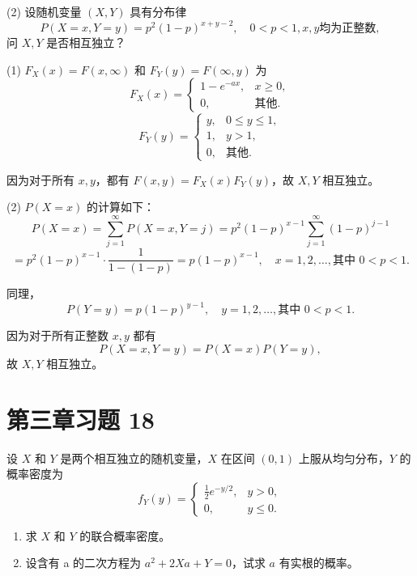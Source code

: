 \documentclass[twoside]{article}
\begin{document}
(2) 设随机变量 \( (X, Y) \) 具有分布律
\[
P(X = x, Y = y) = p^2 (1 - p)^{x + y - 2}, \quad 0 < p < 1, x, y \text{均为正整数},
\]
问 \( X, Y \) 是否相互独立？


\begin{ans}{17}{17}
    (1) \( F_X(x) = F(x, \infty) \) 和 \( F_Y(y) = F(\infty, y) \) 为
    \[
    F_X(x) = 
    \begin{cases}
    1 - e^{-ax}, & x \geq 0, \\
    0, & \text{其他}.
    \end{cases}
    \]
    \[
    F_Y(y) = 
    \begin{cases}
    y, & 0 \leq y \leq 1, \\
    1, & y > 1, \\
    0, & \text{其他}.
    \end{cases}
    \]
    
    因为对于所有 \( x, y \)，都有 \( F(x, y) = F_X(x) F_Y(y) \)，故 \( X, Y \) 相互独立。
    
    (2) \( P(X = x) \) 的计算如下：
    \[
    P(X = x) = \sum_{j=1}^{\infty} P(X = x, Y = j) = p^2 (1 - p)^{x - 1} \sum_{j=1}^{\infty} (1 - p)^{j - 1}
    \]
    \[
    = p^2 (1 - p)^{x - 1} \cdot \frac{1}{1 - (1 - p)} = p(1 - p)^{x - 1}, \quad x = 1, 2, \dots, \text{其中 } 0 < p < 1.
    \]
    
    同理，
    \[
    P(Y = y) = p(1 - p)^{y - 1}, \quad y = 1, 2, \dots, \text{其中 } 0 < p < 1.
    \]
    
    因为对于所有正整数 \( x, y \) 都有
    \[
    P(X = x, Y = y) = P(X = x) P(Y = y),
    \]
    故 \( X, Y \) 相互独立。

\end{ans}

\section{第三章习题 18}

设 \( X \) 和 \( Y \) 是两个相互独立的随机变量，\( X \) 在区间 \( (0, 1) \) 上服从均匀分布，\( Y \) 的概率密度为
\[
f_Y(y) = 
\begin{cases} 
\frac{1}{2} e^{-y/2}, & y > 0, \\
0, & y \leq 0.
\end{cases}
\]
\begin{enumerate}
    \item 求 \( X \) 和 \( Y \) 的联合概率密度。
    \item 设含有 a 的二次方程为 \( a^2 + 2Xa + Y = 0 \)，试求 \( a \) 有实根的概率。
\end{enumerate}
\end{document}
